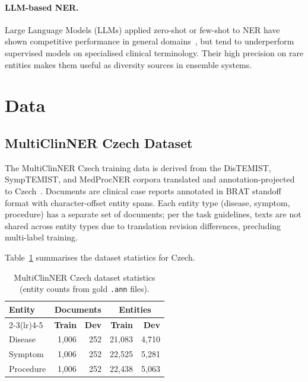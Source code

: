 \documentclass[11pt]{article}
\begin{document}
\paragraph{LLM-based NER.}
Large Language Models (LLMs) applied zero-shot or few-shot to NER have shown competitive
performance in general domains~\cite{wang-etal-2023-gpt}, but tend to underperform supervised
models on specialised clinical terminology. Their high precision on rare entities makes them
useful as diversity sources in ensemble systems.

\section{Data}

\subsection{MultiClinNER Czech Dataset}

The MultiClinNER Czech training data is derived from the DisTEMIST, SympTEMIST, and MedProcNER
corpora translated and annotation-projected to Czech~\cite{multiclinai2026}. Documents are
clinical case reports annotated in BRAT standoff format with character-offset entity spans.
Each entity type (disease, symptom, procedure) has a separate set of documents; per the
task guidelines, texts are not shared across entity types due to translation revision
differences, precluding multi-label training.

Table~\ref{tab:data_stats} summarises the dataset statistics for Czech.

\begin{table}[h]
\centering
\small
\begin{tabular}{lrrrr}
\toprule
\textbf{Entity} & \multicolumn{2}{c}{\textbf{Documents}} & \multicolumn{2}{c}{\textbf{Entities}} \\
\cmidrule(lr){2-3}\cmidrule(lr){4-5}
 & \textbf{Train} & \textbf{Dev} & \textbf{Train} & \textbf{Dev} \\
\midrule
Disease   & 1,006 & 252 & 21,083 & 4,710 \\
Symptom   & 1,006 & 252 & 22,525 & 5,281 \\
Procedure & 1,006 & 252 & 22,438 & 5,063 \\
\bottomrule
\end{tabular}
\caption{MultiClinNER Czech dataset statistics (entity counts from gold \texttt{.ann} files).}
\label{tab:data_stats}
\end{table}
\end{document}
